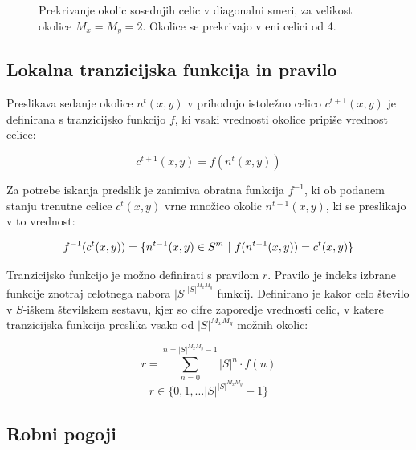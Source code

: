 \documentclass[12pt,a4paper,openany,twoside]{book}
\begin{document}
\vspace{5mm}
\begin{figure}[htb]
\centerline{}
\caption[Prekrivanje okolic \(2 \times 2\) - diagonalno.]
{Prekrivanje okolic sosednjih celic v diagonalni smeri, za velikost okolice \(M_x=M_y=2\).
Okolice se prekrivajo v eni celici od 4.}
\label{overlap_diagonal_quad}
\end{figure}

\subsection{Lokalna tranzicijska funkcija in pravilo}

Preslikava sedanje okolice \(n^{t}(x,y)\) v prihodnjo istoležno celico \(c^{t+1}(x,y)\) je definirana
s tranzicijsko funkcijo \(f\), ki vsaki vrednosti okolice pripiše vrednost celice:

\begin{equation}
c^{t+1}(x,y) = f(n^{t}(x,y))
\end{equation}

Za potrebe iskanja predslik je zanimiva obratna funkcija \(f^{-1}\), ki ob
podanem stanju trenutne celice \(c^{t}(x,y)\) vrne množico okolic \(n^{t-1}(x,y)\),
ki se preslikajo v to vrednost:

\begin{equation}
f^{-1}(c^{t}(x,y)) = \{ n^{t-1}(x,y) \in S^m \ \arrowvert \ f(n^{t-1}(x,y)) = c^{t}(x,y) \}
\end{equation}

Tranzicijsko funkcijo je možno definirati s pravilom  \(r\).
Pravilo je indeks izbrane funkcije znotraj celotnega nabora \(|S|^{|S|^{M_x M_y}}\) funkcij.
Definirano je kakor celo število v \(S\)-iškem številskem sestavu,
kjer so cifre zaporedje vrednosti celic, v katere tranzicijska funkcija
preslika vsako od \(|S|^{M_x M_y}\) možnih okolic:

\begin{equation}
r = \sum_{n=0}^{n=|S|^{M_x M_y}-1} |S|^n \cdot f(n)
\end{equation}
\begin{equation}
r \in \{0, 1, \ldots |S|^{|S|^{M_x M_y}}-1\}
\end{equation}

\subsection{Robni pogoji}
\end{document}
